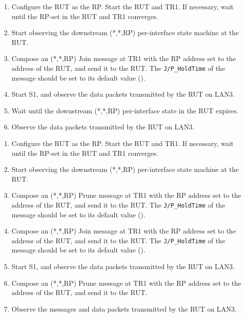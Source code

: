 \documentclass[11pt]{report}
\begin{document}


\begin{enumerate}

  \item Configure the RUT as the RP. Start the RUT and TR1. If
  necessary, wait until the RP-set in the RUT and TR1 converges.

  \item Start observing the downstream (*,*,RP) per-interface state
  machine at the RUT.

  \item Compose an (*,*,RP) Join message at TR1 with the RP address set
  to the address of the RUT, and send it to the RUT.
  The \verb=J/P_HoldTime= of the message should be set to its default
  value ({\PimsmJPHoldTime}).

  \item Start S1, and observe the data packets transmitted by the RUT on
  LAN3.

  \item Wait until the downstream (*,*,RP) per-interface state in the RUT
  expires.

  \item Observe the data packets transmitted by the RUT on LAN3.

\end{enumerate}


\begin{enumerate}

  \item Configure the RUT as the RP. Start the RUT and TR1. If
  necessary, wait until the RP-set in the RUT and TR1 converges.

  \item Start observing the downstream (*,*,RP) per-interface state
  machine at the RUT.

  \item Compose an (*,*,RP) Prune message at TR1 with the RP address set
  to the address of the RUT, and send it to the RUT.
  The \verb=J/P_HoldTime= of the message should be set to its default
  value ({\PimsmJPHoldTime}).

  \item Compose an (*,*,RP) Join message at TR1 with the RP address set
  to the address of the RUT, and send it to the RUT.
  The \verb=J/P_HoldTime= of the message should be set to its default
  value ({\PimsmJPHoldTime}).

  \item Start S1, and observe the data packets transmitted by the RUT on
  LAN3.

  \item Compose an (*,*,RP) Prune message at TR1 with the RP address set
  to the address of the RUT, and send it to the RUT.

  \item Observe the messages and data packets transmitted by the RUT on
  LAN3.

\end{enumerate}
\end{document}
